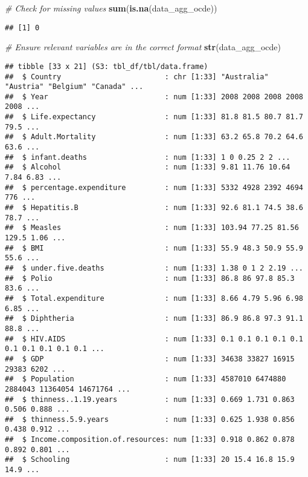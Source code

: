 \documentclass[
]{article}
\newenvironment{Shaded}{\begin{snugshade}}{\end{snugshade}}
\newcommand{\CommentTok}[1]{\textcolor[rgb]{0.56,0.35,0.01}{\textit{#1}}}
\newcommand{\FunctionTok}[1]{\textcolor[rgb]{0.13,0.29,0.53}{\textbf{#1}}}
\newcommand{\NormalTok}[1]{#1}
\begin{document}
\begin{Shaded}
\begin{Highlighting}[]
\CommentTok{\# Check for missing values}
\FunctionTok{sum}\NormalTok{(}\FunctionTok{is.na}\NormalTok{(data\_agg\_ocde))}
\end{Highlighting}
\end{Shaded}

\begin{verbatim}
## [1] 0
\end{verbatim}

\begin{Shaded}
\begin{Highlighting}[]
\CommentTok{\# Ensure relevant variables are in the correct format}
\FunctionTok{str}\NormalTok{(data\_agg\_ocde)}
\end{Highlighting}
\end{Shaded}

\begin{verbatim}
## tibble [33 x 21] (S3: tbl_df/tbl/data.frame)
##  $ Country                        : chr [1:33] "Australia" "Austria" "Belgium" "Canada" ...
##  $ Year                           : num [1:33] 2008 2008 2008 2008 2008 ...
##  $ Life.expectancy                : num [1:33] 81.8 81.5 80.7 81.7 79.5 ...
##  $ Adult.Mortality                : num [1:33] 63.2 65.8 70.2 64.6 63.6 ...
##  $ infant.deaths                  : num [1:33] 1 0 0.25 2 2 ...
##  $ Alcohol                        : num [1:33] 9.81 11.76 10.64 7.84 6.83 ...
##  $ percentage.expenditure         : num [1:33] 5332 4928 2392 4694 776 ...
##  $ Hepatitis.B                    : num [1:33] 92.6 81.1 74.5 38.6 78.7 ...
##  $ Measles                        : num [1:33] 103.94 77.25 81.56 129.5 1.06 ...
##  $ BMI                            : num [1:33] 55.9 48.3 50.9 55.9 55.6 ...
##  $ under.five.deaths              : num [1:33] 1.38 0 1 2 2.19 ...
##  $ Polio                          : num [1:33] 86.8 86 97.8 85.3 83.6 ...
##  $ Total.expenditure              : num [1:33] 8.66 4.79 5.96 6.98 6.85 ...
##  $ Diphtheria                     : num [1:33] 86.9 86.8 97.3 91.1 88.8 ...
##  $ HIV.AIDS                       : num [1:33] 0.1 0.1 0.1 0.1 0.1 0.1 0.1 0.1 0.1 0.1 ...
##  $ GDP                            : num [1:33] 34638 33827 16915 29383 6202 ...
##  $ Population                     : num [1:33] 4587010 6474880 2884043 11364054 14671764 ...
##  $ thinness..1.19.years           : num [1:33] 0.669 1.731 0.863 0.506 0.888 ...
##  $ thinness.5.9.years             : num [1:33] 0.625 1.938 0.856 0.438 0.912 ...
##  $ Income.composition.of.resources: num [1:33] 0.918 0.862 0.878 0.892 0.801 ...
##  $ Schooling                      : num [1:33] 20 15.4 16.8 15.9 14.9 ...
\end{verbatim}
\end{document}
